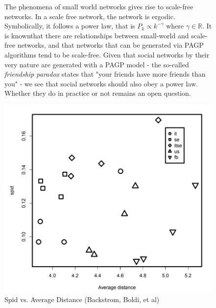     \begin{figure}[H]
        \begin{minipage}{.5\textwidth}
        The phenomena of small world networks gives rise to scale-free networks. In a scale free network, the network is ergodic. Symbolically, it follows a power law, that is $P_k\propto k^{-\gamma}$ where $\gamma\in\mathbb{R}$. It is known\footnotemark[3] that there are relationships between small-world and scale-free networks, and that networks that can be generated via PAGP algorithms tend to be scale-free\footnotemark[4]. Given that social networks by their very nature are generated with a PAGP model - the so-called \textit{friendship paradox} states that "your friends have more friends than you" - we see that social networks should also obey a power law. Whether they do in practice or not remains an open question.
        \end{minipage}%
        \begin{minipage}{.5\textwidth}\centering
            \includegraphics[width=\textwidth]{journals/SR-SpidVsDistance.PNG}
            \caption{Spid vs. Average Distance (Backstrom, Boldi, et al)}
            \label{fig:avdistspid}
        \end{minipage}
    \end{figure}
    
